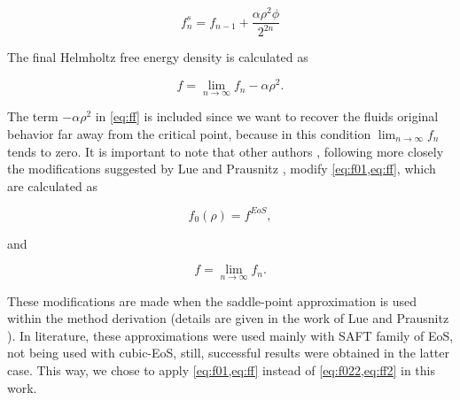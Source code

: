 \documentclass[preprint,12pt,3p]{elsarticle}
\begin{document}
\begin{equation} \label{eq:fns}
f_{n}^{s} = f_{n-1} + \frac{\alpha \rho^2 \phi}{2^{2n}}
\end{equation}

The final Helmholtz free energy density is calculated as

\begin{equation} \label{eq:ff}
f = \lim_{n \rightarrow \infty} f_{n} - \alpha\rho^2.
\end{equation}

The term $-\alpha\rho^2$ in \cref{eq:ff} is included since we want to recover the fluids original behavior far away from the critical point, because in this condition $\lim_{n \rightarrow \infty} f_{n}$ tends to zero.
It is important to note that other authors \cite{llovell2004thermodynamic,llovell2006global,llovell2006prediction,bymaster2008renormalization,tang2010renormalization}, following more closely the modifications suggested by Lue and Prausnitz \cite{lue1998brenormalization}, modify \cref{eq:f01,eq:ff}, which are calculated as

\begin{equation} \label{eq:f022}
f_{0}(\rho) = f^{EoS},
\end{equation}

and

\begin{equation} \label{eq:ff2}
f = \lim_{n \rightarrow \infty} f_{n}.
\end{equation}

These modifications are made when the saddle-point approximation is used within the method derivation (details are given in the work of Lue and Prausnitz \cite{lue1998brenormalization}).
In literature, these approximations were used mainly with SAFT family of EoS, not being used with cubic-EoS, still, successful results were obtained in the latter case.
This way, we chose to apply \cref{eq:f01,eq:ff} instead of \cref{eq:f022,eq:ff2} in this work.
\end{document}

